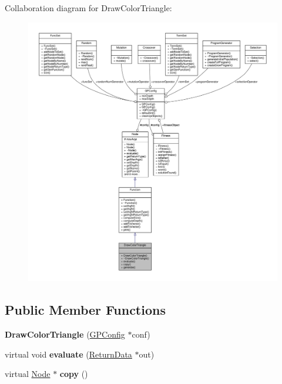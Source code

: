 Collaboration diagram for Draw\+Color\+Triangle\+:
\nopagebreak
\begin{figure}[H]
\begin{center}
\leavevmode
\includegraphics[width=350pt]{classDrawColorTriangle__coll__graph}
\end{center}
\end{figure}
\subsection*{Public Member Functions}
\begin{DoxyCompactItemize}
\item 
\hypertarget{classDrawColorTriangle_a0bbb6e498405631981f2af8c30bed2a3}{}\label{classDrawColorTriangle_a0bbb6e498405631981f2af8c30bed2a3} 
{\bfseries Draw\+Color\+Triangle} (\hyperlink{classGPConfig}{G\+P\+Config} $\ast$conf)
\item 
\hypertarget{classDrawColorTriangle_a015d98a34270b2e0d50abc398cec39e3}{}\label{classDrawColorTriangle_a015d98a34270b2e0d50abc398cec39e3} 
virtual void {\bfseries evaluate} (\hyperlink{classReturnData}{Return\+Data} $\ast$out)
\item 
\hypertarget{classDrawColorTriangle_a8854b0eedda24cb7e68088ea04fa3d31}{}\label{classDrawColorTriangle_a8854b0eedda24cb7e68088ea04fa3d31} 
virtual \hyperlink{classNode}{Node} $\ast$ {\bfseries copy} ()
\end{DoxyCompactItemize}
